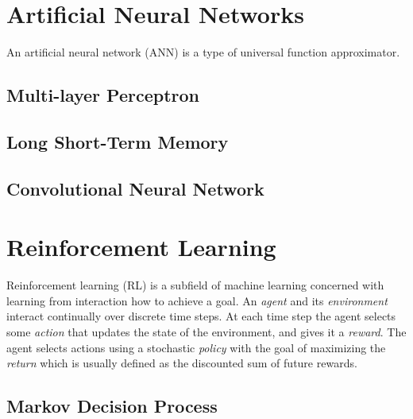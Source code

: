 
\section{Artificial Neural Networks}

An artificial neural network (ANN) is a type of universal function approximator.


\subsection{Multi-layer Perceptron}

\subsection{Long Short-Term Memory}


\subsection{Convolutional Neural Network}



\section{Reinforcement Learning}

Reinforcement learning (RL) is a subfield of machine learning concerned with learning from interaction how to achieve a goal.
An \textit{agent} and its \textit{environment} interact continually over discrete time steps.
At each time step the agent selects some \textit{action} that updates the state of the environment, and gives it a \textit{reward}.
The agent selects actions using a stochastic \textit{policy} with the goal of maximizing the \textit{return} which is usually defined as the discounted sum of future rewards.~\cite{sutton_reinforcement_2018}

\subsection{Markov Decision Process}

